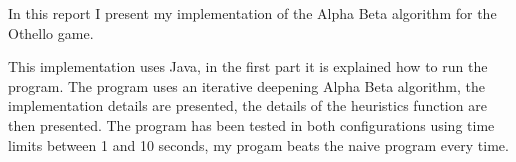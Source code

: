 In this report I present my implementation of the Alpha Beta algorithm for the Othello game.

This implementation uses Java, in the first part it is explained how to run the program.
The program uses an iterative deepening Alpha Beta algorithm, the implementation details are presented, the details of the heuristics function are then presented.
The program has been tested in both configurations using time limits between 1 and 10 seconds, my progam beats the naive program every time.

